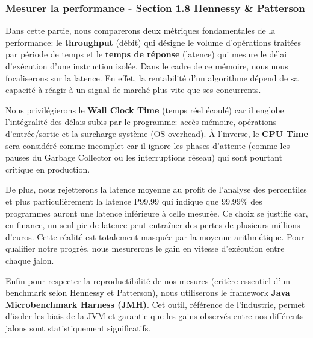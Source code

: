 \subsubsection{Mesurer la performance - Section 1.8 Hennessy \& Patterson}

Dans cette partie, nous comparerons deux métriques fondamentales de la performance: le \textbf{throughput} (débit) qui désigne le volume d'opérations traitées par période de temps et le \textbf{temps de réponse} (latence) qui mesure le délai d'exécution d'une instruction isolée. Dans le cadre de ce mémoire, nous nous focaliserons sur la latence. En effet, la rentabilité d'un algorithme dépend de sa capacité à réagir à un signal de marché plus vite que ses concurrents.

Nous privilégierons le \textbf{Wall Clock Time} (temps réel écoulé) car il englobe l'intégralité des délais subis par le programme: accès mémoire, opérations d'entrée/sortie et la surcharge système (OS overhead). À l'inverse, le \textbf{CPU Time} sera considéré comme incomplet car il ignore les phases d'attente (comme les pauses du Garbage Collector ou les interruptions réseau) qui sont pourtant critique en production.

De plus, nous rejetterons la latence moyenne au profit de l'analyse des percentiles et plus particulièrement la latence P99.99 qui indique que 99.99\% des programmes auront une latence inférieure à celle mesurée. Ce choix se justifie car, en finance, un seul pic de latence peut entraîner des pertes de plusieurs millions d'euros. Cette réalité est totalement masquée par la moyenne arithmétique. Pour qualifier notre progrès, nous mesurerons le gain en vitesse d'exécution entre chaque jalon.

Enfin pour respecter la reproductibilité de nos mesures (critère essentiel d'un benchmark selon Hennessy et Patterson), nous utiliserons le framework \textbf{Java Microbenchmark Harness (JMH)}. Cet outil, référence de l'industrie, permet d'isoler les biais de la JVM et garantie que les gains observés entre nos différents jalons sont statistiquement significatifs.


